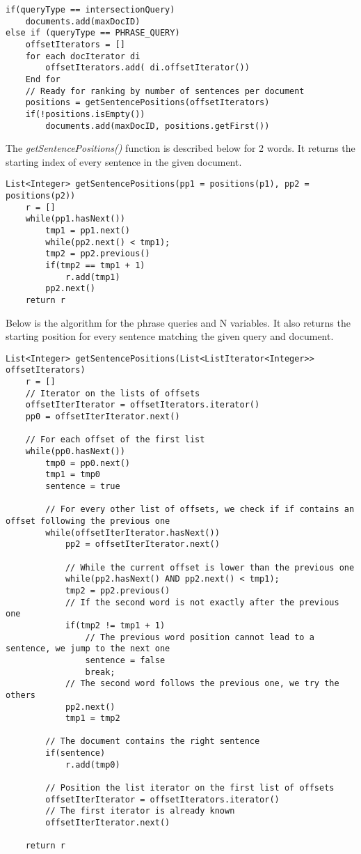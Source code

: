 \begin{lstlisting}
if(queryType == intersectionQuery)
    documents.add(maxDocID)
else if (queryType == PHRASE_QUERY)
    offsetIterators = []
    for each docIterator di
        offsetIterators.add( di.offsetIterator())
    End for
    // Ready for ranking by number of sentences per document
    positions = getSentencePositions(offsetIterators)
    if(!positions.isEmpty())
        documents.add(maxDocID, positions.getFirst())
\end{lstlisting}

The \textit{getSentencePositions()} function is described below for 2 words. It returns the starting index of every sentence in the given document.

\begin{lstlisting}
List<Integer> getSentencePositions(pp1 = positions(p1), pp2 = positions(p2))
    r = []
    while(pp1.hasNext())
        tmp1 = pp1.next()
        while(pp2.next() < tmp1);
        tmp2 = pp2.previous()
        if(tmp2 == tmp1 + 1)
            r.add(tmp1)
        pp2.next()
    return r
\end{lstlisting}
    

Below is the algorithm for the phrase queries and N variables. It also returns the starting position for every sentence matching the given query and document.

\begin{lstlisting}
List<Integer> getSentencePositions(List<ListIterator<Integer>> offsetIterators)
    r = []
    // Iterator on the lists of offsets
    offsetIterIterator = offsetIterators.iterator()
    pp0 = offsetIterIterator.next()

    // For each offset of the first list
    while(pp0.hasNext())
        tmp0 = pp0.next()
        tmp1 = tmp0
        sentence = true

        // For every other list of offsets, we check if if contains an offset following the previous one
        while(offsetIterIterator.hasNext())
            pp2 = offsetIterIterator.next()

            // While the current offset is lower than the previous one
            while(pp2.hasNext() AND pp2.next() < tmp1);
            tmp2 = pp2.previous()
            // If the second word is not exactly after the previous one
            if(tmp2 != tmp1 + 1)
                // The previous word position cannot lead to a sentence, we jump to the next one
                sentence = false
                break;
            // The second word follows the previous one, we try the others
            pp2.next()
            tmp1 = tmp2

        // The document contains the right sentence
        if(sentence)
            r.add(tmp0)

        // Position the list iterator on the first list of offsets
        offsetIterIterator = offsetIterators.iterator()
        // The first iterator is already known
        offsetIterIterator.next()
    
    return r
\end{lstlisting}

